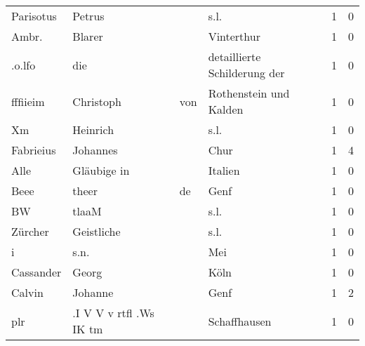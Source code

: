 \begin{center}
\begin{tiny}
\begin{longtabu}{llllrr}
                Parisotus &                             Petrus &             &                                        s.l. &          1 &         0 \\
                    Ambr. &                             Blarer &             &                                  Vinterthur &          1 &         0 \\
                   .o.lfo &                                die &             &                detaillierte Schilderung der &          1 &         0 \\
                 fffiieim &                          Christoph &         von &                      Rothenstein und Kalden &          1 &         0 \\
                       Xm &                           Heinrich &             &                                        s.l. &          1 &         0 \\
                Fabrieius &                           Johannes &             &                                        Chur &          1 &         4 \\
                     Alle &                        Gläubige in &             &                                     Italien &          1 &         0 \\
                     Beee &                              theer &          de &                                        Genf &          1 &         0 \\
                       BW &                              tlaaM &             &                                        s.l. &          1 &         0 \\
                  Zürcher &                         Geistliche &             &                                        s.l. &          1 &         0 \\
                        i &                               s.n. &             &                                         Mei &          1 &         0 \\
                Cassander &                              Georg &             &                                        Köln &          1 &         0 \\
                   Calvin &                            Johanne &             &                                        Genf &          1 &         2 \\
                      plr &            .I V V v rtfl .Ws IK tm &             &                                Schaffhausen &          1 &         0 \\

\end{longtabu}
\end{tiny}
\end{center}

